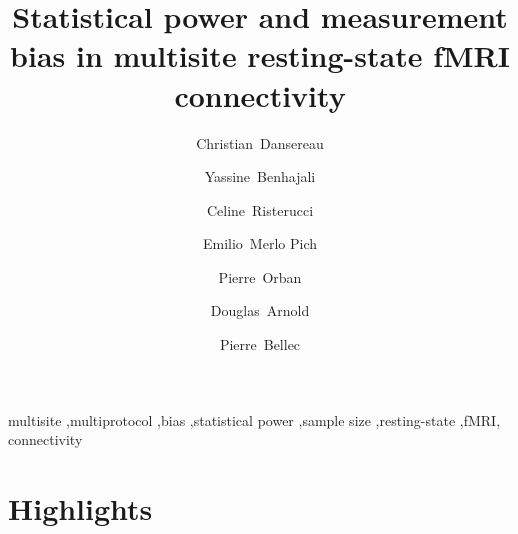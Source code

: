\documentclass[authoryear]{elsarticle}
\begin{document}
\begin{frontmatter}

\title{Statistical power and measurement bias in multisite resting-state fMRI connectivity}



\author[a,b]{Christian~Dansereau}
\author[a]{Yassine~Benhajali}
\author[c]{Celine~Risterucci}
\author[c]{Emilio~Merlo Pich}
\author[a]{Pierre~Orban}
\author[d]{Douglas~Arnold}
\author[a,b]{Pierre~Bellec}
\address[a]{Centre de Recherche de l'Institut Universitaire de G\'eriatrie de Montr\'eal, Montr\'eal, CA}
\address[b]{D\'epartement d'Informatique et de recherche op\'erationnelle, Universit\'e de Montr\'eal, Montr\'eal,CA}
\address[c]{F. Hoffmann-La Roche Ldt., Basel, Switzerland}
\address[d]{NeuroRx, Montreal, Quebec, Canada}

\begin{abstract}


\end{abstract}

\begin{keyword}
multisite \sep multiprotocol \sep bias \sep statistical power \sep sample size \sep resting-state \sep fMRI, connectivity
\end{keyword}
\end{frontmatter}


\section*{Highlights}
\end{document}
